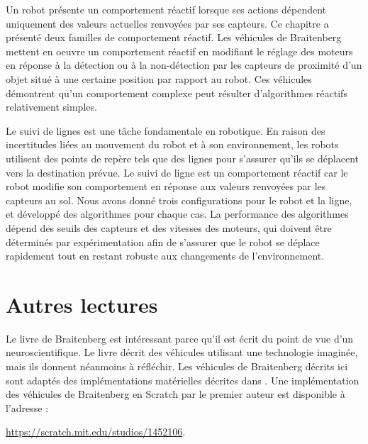 Un robot présente un comportement réactif lorsque ses actions dépendent uniquement des valeurs actuelles renvoyées par ses capteurs. Ce chapitre a présenté deux familles de comportement réactif. Les véhicules de Braitenberg mettent en oeuvre un comportement réactif en modifiant le réglage des moteurs en réponse à la détection ou à la non-détection par les capteurs de proximité d'un objet situé à une certaine position par rapport au robot. Ces véhicules démontrent qu'un comportement complexe peut résulter d'algorithmes réactifs relativement simples.

Le suivi de lignes est une tâche fondamentale en robotique. En raison des incertitudes liées au mouvement du robot et à son environnement, les robots utilisent des points de repère tels que des lignes pour s'assurer qu'ils se déplacent vers la destination prévue. Le suivi de ligne est un comportement réactif car le robot modifie son comportement en réponse aux valeurs renvoyées par les capteurs au sol. Nous avons donné trois configurations pour le robot et la ligne, et développé des algorithmes pour chaque cas. La performance des algorithmes dépend des seuils des capteurs et des vitesses des moteurs, qui doivent être déterminés par expérimentation afin de s'assurer que le robot se déplace rapidement tout en restant robuste aux changements de l'environnement.

\section{Autres lectures}

Le livre de Braitenberg \cite{valentino} est intéressant parce qu'il est écrit du point de vue d'un neuroscientifique. Le livre décrit des véhicules utilisant une technologie imaginée, mais ils donnent néanmoins à réfléchir. Les véhicules de Braitenberg décrits ici sont adaptés des implémentations matérielles décrites dans \cite{creatures}. Une implémentation des véhicules de Braitenberg en Scratch par le premier auteur est disponible à l'adresse :
\par\noindent\url{https://scratch.mit.edu/studios/1452106}.
